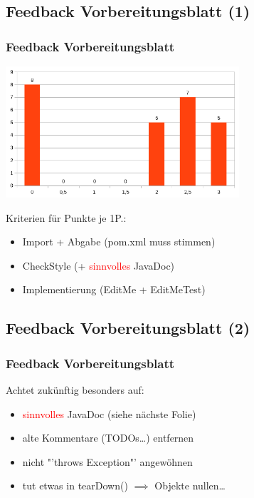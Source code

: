 \documentclass[18pt]{beamer}
\begin{document}
	\subsection{Feedback Vorbereitungsblatt (1)}	
	\begin{frame}
		\frametitle{Feedback Vorbereitungsblatt}
		\includegraphics[width=0.65\textwidth, scale=0.8]{./pics/tut0/points-prep-sheet.png}
		\begin{block}{Kriterien für Punkte}
			je 1P.:
			\begin{itemize}
				\item Import + Abgabe (pom.xml muss stimmen)
				\item CheckStyle (+ \textcolor{red}{sinnvolles} JavaDoc)
				\item Implementierung (EditMe + EditMeTest)
			\end{itemize}
		\end{block}
	\end{frame}
	
	\subsection{Feedback Vorbereitungsblatt (2)}
	\begin{frame}
		\frametitle{Feedback Vorbereitungsblatt}
		Achtet zukünftig besonders auf:
		\begin{itemize}
			\item \textcolor{red}{sinnvolles} JavaDoc (siehe nächste Folie)
			\item alte Kommentare (TODOs\dots) entfernen
			\item nicht "'throws Exception"' angewöhnen
			\item tut etwas in tearDown() $\implies$ Objekte nullen\dots
		\end{itemize}
	\end{frame}
	
\end{document}
